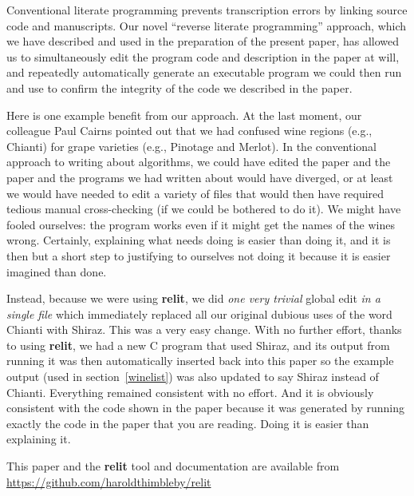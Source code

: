 \documentclass[12pt]{article}
\def\name#1{\textbf{#1}}
\begin{document}
Conventional literate programming prevents transcription errors by linking source code and manuscripts. Our novel ``reverse literate programming'' approach, which we have described and used in the preparation of the present paper, has allowed us to simultaneously edit the program code and description in the paper at will, and repeatedly automatically generate an executable program we could then run and use to confirm the integrity of the code we described in the paper. 

Here is one example benefit from our approach. At the last moment, our colleague Paul Cairns pointed out that we had confused wine regions (e.g., Chianti) for grape varieties (e.g., Pinotage and Merlot). In the conventional approach to writing about algorithms, we could have edited the paper and the paper and the programs we had written about would have diverged, or at least we would have needed to edit a variety of files that would then have required tedious manual cross-checking (if we could be bothered to do it). We might have fooled ourselves: the program works even if it might get the names of the wines wrong. Certainly, explaining what needs doing is easier than doing it, and it is then but a short step to justifying to ourselves not doing it because it is easier imagined than done.

Instead, because we were using \name{relit}, we did \emph{one very trivial\/} global edit \emph{in a single file\/} which immediately replaced all our original dubious uses of the word Chianti with Shiraz. This was a very easy change. With no further effort, thanks to using \name{relit}, we had a new C program that used Shiraz, and its output from running it was then automatically inserted back into this paper so the example output (used in section~\ref{winelist}) was also updated  to say Shiraz instead of Chianti. Everything remained consistent with no effort. And it is obviously consistent with the code shown in the paper because it was generated by running exactly the code in the paper that you are reading. Doing it is easier than explaining it.

This paper and the \name{relit} tool and documentation are available from \url{https://github.com/haroldthimbleby/relit}

\end{document}

